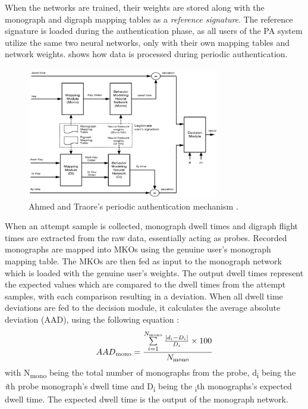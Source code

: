 \documentclass[informationsecurity]{gucmasterproject}
\begin{document}
When the networks are trained, their weights are stored along with the monograph and digraph mapping tables as a \textit{reference signature}.
The reference signature is loaded during the authentication phase, as all users of the PA system utilize the same two neural networks, only with their own mapping tables and network weights.
 shows how data is processed during periodic authentication.
\begin{figure}[h]
    \centering
    \includegraphics[width=0.75\textwidth]{ahmed/authentication}
    \caption{Ahmed and Traore's periodic authentication mechanism \cite{Ahmed}.}
    \label{fig:ahmed-authentication}
\end{figure}
When an attempt sample is collected, monograph dwell times and digraph flight times are extracted from the raw data, essentially acting as probes.
Recorded monographs are mapped into MKOs using the genuine user's monograph mapping table.
The MKOs are then fed as input to the monograph network which is loaded with the genuine user's weights.
The output dwell times represent the expected values which are compared to the dwell times from the attempt samples, with each comparison resulting in a deviation.
When all dwell time deviations are fed to the decision module, it calculates the average absolute deviation (AAD), using the following equation \cite{Ahmed}:
\begin{equation}
AAD\textsubscript{mono}={{\sum\limits_{i=1}^{N_{\rm mono}}{{{\left\vert{d_{i}-D_{i}}\right\vert}\over{D_{i}}}\times100}}\over{N_{\rm mono}}}
\end{equation}
with N\textsubscript{mono} being the total number of monographs from the probe, d\textsubscript{i} being the \textit{i}th probe monograph's dwell time and D\textsubscript{i} being the \textsubscript{i}th monographs's expected dwell time.
The expected dwell time is the output of the monograph network.
\end{document}
